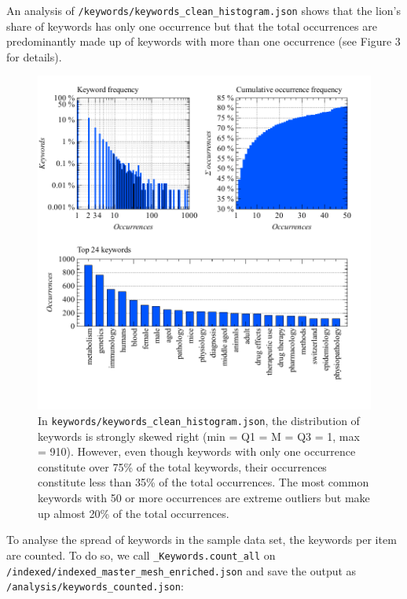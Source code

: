 An analysis of \texttt{/keywords/keywords\_clean\_histogram.json} shows
that the lion's share of keywords has only one occurrence but that the
total occurrences are predominantly made up of keywords with more than
one occurrence (see Figure 3 for details).

\begin{figure}
\centering
\includegraphics{images/keywords_clean_histogram_abc.pdf}
\caption{In \texttt{keywords/keywords\_clean\_histogram.json}, the
distribution of keywords is strongly skewed right (min = Q1 = M = Q3 =
1, max = 910). However, even though keywords with only one occurrence
constitute over 75\% of the total keywords, their occurrences constitute
less than 35\% of the total occurrences. The most common keywords with
50 or more occurrences are extreme outliers but make up almost 20\% of
the total occurrences.}
\end{figure}

To analyse the spread of keywords in the sample data set, the keywords
per item are counted. To do so, we call \texttt{\_Keywords.count\_all}
on \texttt{/indexed/indexed\_master\_mesh\_enriched.json} and save the
output as \texttt{/analysis/keywords\_counted.json}:

\begin{Shaded}
\begin{Highlighting}[]
\OperatorTok{=}\OperatorTok{+} \NormalTok{)}
\OperatorTok{=}
\OperatorTok{+} \NormalTok{)}
\end{Highlighting}
\end{Shaded}

